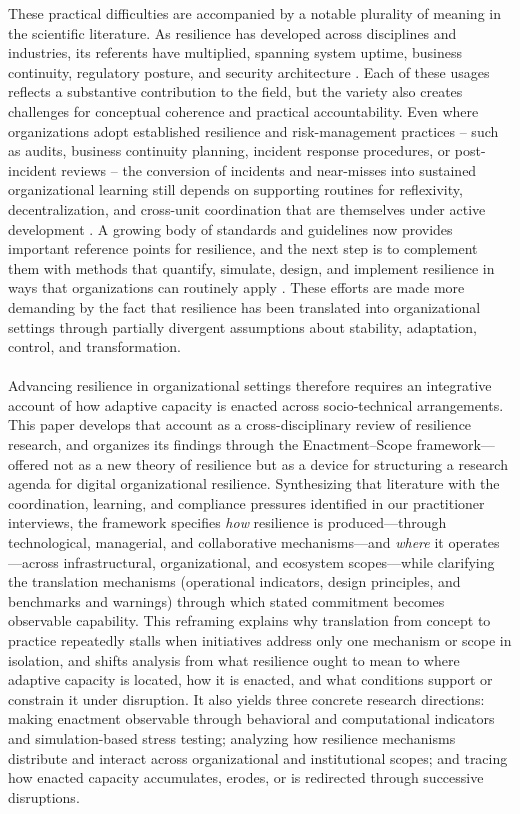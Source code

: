 These practical difficulties are accompanied by a notable plurality of meaning in the scientific literature. As resilience has developed across disciplines and industries, its referents have multiplied, spanning system uptime, business continuity, regulatory posture, and security architecture \autocite{woods2015four,hillmann2021organizational}. Each of these usages reflects a substantive contribution to the field, but the variety also creates challenges for conceptual coherence and practical accountability. Even where organizations adopt established resilience and risk-management practices -- such as audits, business continuity planning, incident response procedures, or post-incident reviews -- the conversion of incidents and near-misses into sustained organizational learning still depends on supporting routines for reflexivity, decentralization, and cross-unit coordination that are themselves under active development \autocite{francis2014metric,barasa2018what}. A growing body of standards and guidelines now provides important reference points for resilience, and the next step is to complement them with methods that quantify, simulate, design, and implement resilience in ways that organizations can routinely apply \autocite{kuypers2018designing}. These efforts are made more demanding by the fact that resilience has been translated into organizational settings through partially divergent assumptions about stability, adaptation, control, and transformation.\\
\\
Advancing resilience in organizational settings therefore requires an integrative account of how adaptive capacity is enacted across socio-technical arrangements. This paper develops that account as a cross-disciplinary review of resilience research, and organizes its findings through the Enactment--Scope framework---offered not as a new theory of resilience but as a device for structuring a research agenda for digital organizational resilience. Synthesizing that literature with the coordination, learning, and compliance pressures identified in our practitioner interviews, the framework specifies \emph{how} resilience is produced---through technological, managerial, and collaborative mechanisms---and \emph{where} it operates---across infrastructural, organizational, and ecosystem scopes---while clarifying the translation mechanisms (operational indicators, design principles, and benchmarks and warnings) through which stated commitment becomes observable capability. This reframing explains why translation from concept to practice repeatedly stalls when initiatives address only one mechanism or scope in isolation, and shifts analysis from what resilience ought to mean to where adaptive capacity is located, how it is enacted, and what conditions support or constrain it under disruption. It also yields three concrete research directions: making enactment observable through behavioral and computational indicators and simulation-based stress testing; analyzing how resilience mechanisms distribute and interact across organizational and institutional scopes; and tracing how enacted capacity accumulates, erodes, or is redirected through successive disruptions.

